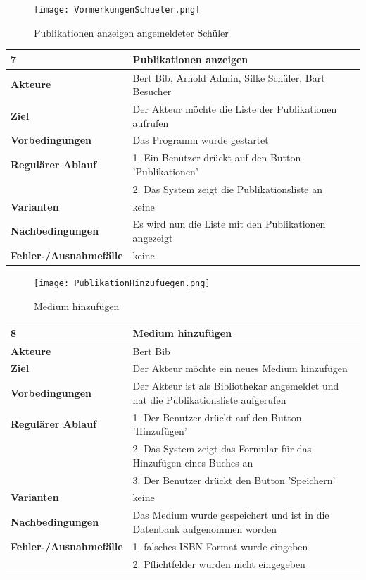 \documentclass[fontsize=12pt,paper=a4,twoside]{scrartcl}
\begin{document}
\begin{figure}
	[H] \caption{Publikationen anzeigen angemeldeter Schüler} 
	\texttt{[image: VormerkungenSchueler.png]} \label{pic:PubAnzeigen} 
\end{figure}
\begin{table}
	[H] \label{7} 
	\begin{tabular}
		{|l|p{10cm}|} \hline \textbf{7} & \textbf{Publikationen anzeigen} \\
		\hline \textbf{Akteure} & Bert Bib, Arnold Admin, Silke Schüler, Bart Besucher\\
		\hline \textbf{Ziel} & Der Akteur möchte die Liste der Publikationen aufrufen \\
		\hline \textbf{Vorbedingungen} & Das Programm wurde gestartet \\
		\hline \textbf{Regulärer Ablauf} & 1. Ein Benutzer drückt auf den Button 'Publikationen' \\
		&2. Das System zeigt die Publikationsliste an\\
		\hline \textbf{Varianten} & keine \\
		\hline \textbf{Nachbedingungen} & Es wird nun die Liste mit den Publikationen angezeigt \\
		\hline \textbf{Fehler-/Ausnahmefälle} & keine\\
		\hline 
	\end{tabular}
\end{table}
\begin{figure}
	[H] \caption{Medium hinzufügen} 
	\texttt{[image: PublikationHinzufuegen.png]} \label{pic:MedHinzufuegen} 
\end{figure}
\begin{table}
	[H] \label{8} 
	\begin{tabular}
		{|l|p{10cm}|} \hline \textbf{8} & \textbf{Medium hinzufügen} \\
		\hline \textbf{Akteure} & Bert Bib\\
		\hline \textbf{Ziel} & Der Akteur möchte ein neues Medium hinzufügen \\
		\hline \textbf{Vorbedingungen} & Der Akteur ist als Bibliothekar angemeldet und hat die Publikationsliste aufgerufen \\
		\hline \textbf{Regulärer Ablauf} & 1. Der Benutzer drückt auf den Button 'Hinzufügen' \\
		&2. Das System zeigt das Formular für das Hinzufügen eines Buches an\\
		&3. Der Benutzer drückt den Button 'Speichern'\\
		\hline \textbf{Varianten} & keine \\
		\hline \textbf{Nachbedingungen} & Das Medium wurde gespeichert und ist in die Datenbank aufgenommen worden\\
		\hline \textbf{Fehler-/Ausnahmefälle} & 1. falsches ISBN-Format wurde eingeben\\
		&2. Pflichtfelder wurden nicht eingegeben\\
		\hline 
	\end{tabular}
\end{table}
\end{document}
